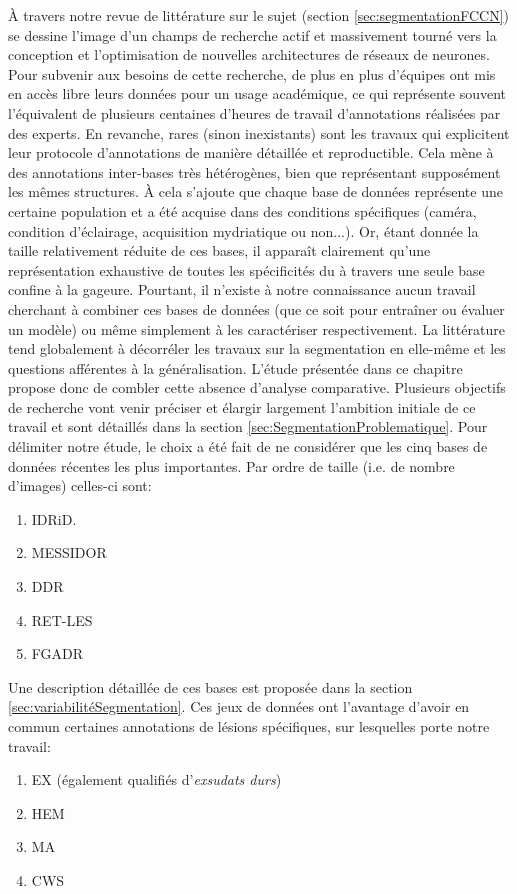 À travers notre revue de littérature sur le sujet (section \ref{sec:segmentationFCCN})  se dessine l'image d'un champs de recherche actif et massivement tourné vers la conception et l'optimisation de nouvelles architectures de réseaux de neurones. Pour subvenir aux besoins de cette recherche, de plus en plus d'équipes ont mis en accès libre leurs données pour un usage académique, ce qui représente souvent l'équivalent de plusieurs centaines d'heures de travail d'annotations réalisées par des experts. En revanche, rares (sinon inexistants) sont les travaux qui explicitent leur protocole d'annotations de manière détaillée et reproductible. Cela mène à des annotations inter-bases très hétérogènes, bien que représentant supposément les mêmes structures. À cela s'ajoute que chaque base de données représente une certaine population et a été acquise dans des conditions spécifiques (caméra, condition d'éclairage, acquisition mydriatique ou non...). Or, étant donnée la taille relativement réduite de ces bases, il apparaît clairement qu'une représentation exhaustive de toutes les spécificités du \fundus{} à travers une seule base confine à la gageure. Pourtant, il n'existe à notre connaissance aucun travail cherchant à combiner ces bases de données (que ce soit pour entraîner ou évaluer un modèle) ou même simplement à les caractériser respectivement. La littérature tend globalement à décorréler les travaux sur la segmentation en elle-même et les questions afférentes à la généralisation.
L'étude présentée dans ce chapitre propose donc de combler cette absence d'analyse comparative. Plusieurs objectifs de recherche vont venir préciser et élargir largement l'ambition initiale de ce travail et sont détaillés dans la section \ref{sec:SegmentationProblematique}. Pour délimiter notre étude, le choix a été fait de ne considérer que les cinq bases de données récentes les plus importantes. Par ordre de taille (i.e. de 
nombre d'images) celles-ci sont:
\begin{enumerate}
	\item \acf{IDRiD}\cite{porwalIDRiDDiabeticRetinopathy2020}.
	\item MESSIDOR \cite{decenciereFEEDBACKPUBLICLYDISTRIBUTED2014b}
	\item \acf{DDR} \cite{liDiagnosticAssessmentDeep2019a}
	\item RET-LES \cite{weiLearnSegmentRetinal2021}
	\item \acf{FGADR} \cite{zhouBenchmarkStudyingDiabetic2021}
\end{enumerate}
Une description détaillée de ces bases est proposée dans la section \ref{sec:variabilitéSegmentation}.
Ces jeux de données ont l'avantage d'avoir en commun certaines annotations de lésions spécifiques, sur lesquelles porte notre travail:
\begin{enumerate}
	\item \acf{EX} (également qualifiés d'\textit{exsudats durs})
	\item \acf{HEM}
	\item \acf{MA}
	\item \acf{CWS}
\end{enumerate}

